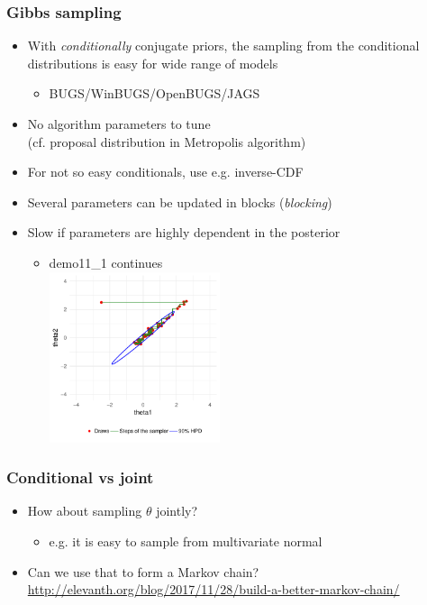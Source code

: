 \documentclass[10pt,handout]{beamer}
\begin{document}
\begin{frame}

\frametitle{ Gibbs sampling}

  \vspace{-0.5\baselineskip}
  \begin{itemize}
  \item With {\it conditionally} conjugate priors, the sampling from
    the conditional distributions is easy for wide range of models
    \begin{itemize}
      \item BUGS/WinBUGS/OpenBUGS/JAGS
    \end{itemize}
  \item<2-> No algorithm parameters to tune\\
    (cf. proposal distribution in Metropolis algorithm)
  \item<3-> For not so easy conditionals, use  e.g. inverse-CDF
  \item<4-> Several parameters can be updated in blocks ({\em blocking})
  \item<5-> Slow if parameters are highly dependent in the posterior
    \begin{itemize}
    \item<5-> demo11\_1 continues\\
      \vspace{-0.5\baselineskip}
      \hspace{3.5cm}\includegraphics[width=5cm]{figs/Gibbs2.pdf}
    \end{itemize}
  \end{itemize}

\end{frame}

\begin{frame}

\frametitle{ Conditional vs joint}

  \begin{itemize}
  \item How about sampling $\theta$ jointly?
    \begin{itemize}
    \item e.g. it is easy to sample from multivariate normal
    \end{itemize}
    \item<2-> Can we use that to form a Markov chain?\\
      {\small \url{http://elevanth.org/blog/2017/11/28/build-a-better-markov-chain/}}
  \end{itemize}

\end{frame}
\end{document}
